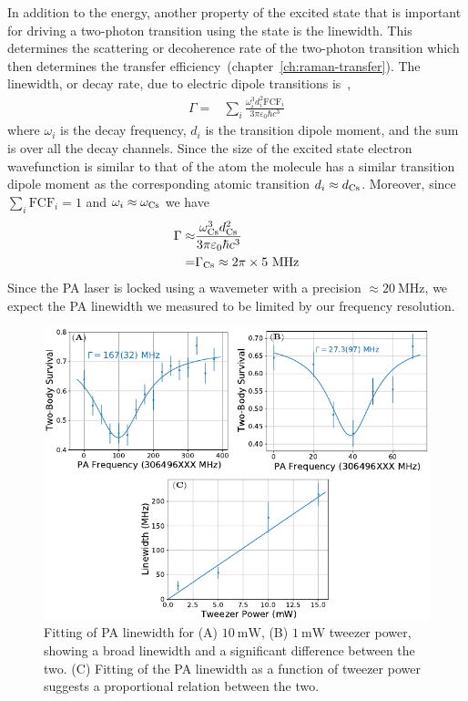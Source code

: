 In addition to the energy, another property of the excited state
that is important for driving a two-photon transition using the state is the linewidth.
This determines the scattering or decoherence rate of
the two-photon transition which then determines
the transfer efficiency~(chapter~\ref{ch:raman-transfer}).
The linewidth, or decay rate, due to electric dipole transitions
is~\cite[p.~197]{bransden_physics_2003},
\begin{align*}
  \Gamma=&\sum_{i}\frac{\omega_i^3d_i^2\mathrm{FCF}_i}{3\pi\varepsilon_0\hbar c^3}
\end{align*}
where $\omega_i$ is the decay frequency, $d_i$ is the transition dipole moment,
and the sum is over all the decay channels.
Since the size of the excited state electron wavefunction is similar to that of the atom
the molecule has a similar transition dipole moment as the corresponding atomic transition
$d_i\approx d_{\mathrm{Cs}}$. Moreover, since $\sum_i\mathrm{FCF}_i=1$ and $\omega_i\approx\omega_{\mathrm{Cs}}$
we have
\begin{align*}
  \Gamma\approx&\frac{\omega_{\mathrm{Cs}}^3d_{\mathrm{Cs}}^2}{3\pi\varepsilon_0\hbar c^3}\\
  =&\Gamma_{\mathrm{Cs}}\approx2\pi\times5~\mathrm{MHz}
\end{align*}
Since the PA laser is locked using a wavemeter with a precision
$\approx\!20~\mathrm{MHz}$, we expect the PA linewidth we measured to be limited
by our frequency resolution.

\begin{figure}
  \centering
  \includegraphics[width=\textwidth]{figures/pa_linewidth_red_twr.pdf}
  \caption[PA linewidth for red detuned tweezer]{
    Fitting of PA linewidth for (A) $10~\mathrm{mW}$, (B) $1~\mathrm{mW}$ tweezer power,
    showing a broad linewidth and a significant difference between the two.
    (C) Fitting of the PA linewidth as a function of tweezer power suggests
    a proportional relation between the two.
    \label{fig:pa:linewidth:red-twr}}
\end{figure}


